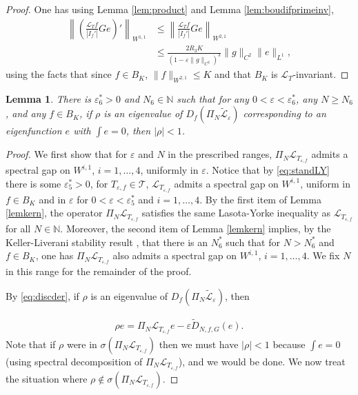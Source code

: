 \documentclass[12pt]{article}
\def\L{\mathcal{L}}
\newcommand{\eps}{\varepsilon}
\theoremstyle{plain}
\newtheorem{lemma}[theorem]{Lemma}
\begin{document}
{\begin{proof}
One has using Lemma \ref{lem:product} and Lemma \ref{lem:boudifprimeinv},
\begin{align}\label{eq:boundnumif}
\left\|\left(\frac{\L_Tf}{|I_{f}'|}  G e\right)'\right\|_{W^{1,1}}&\leq \left\|\frac{\L_Tf}{|I_{f}'|} G e\right\|_{W^{2,1}}\nonumber\\
&\leq \frac{2R_3K}{(1-\eps\|g\|_{C^2})^3} \|g\|_{C^2}\|e\|_{L^1},
\end{align}
using the facts that since $f\in B_K$, $\|f\|_{W^{2,1}}\leq K$ and that $B_K$ is $\L_T$-invariant.
\end{proof}




\begin{lemma}
\label{lem:3.3}
There is $\eps^*_6>0$ and $N_6\in \mathbb N$ such that for any  $0<\eps<\eps^*_6$, any  $N\ge N_6$, and any $f\in B_K$,
if $\rho$ is an 
eigenvalue of $D_f(\Pi_N\tilde{\mathcal L}_\eps)$ 
corresponding to an eigenfunction $e$ with $\int e=0$, then $|\rho|< 1$.
\end{lemma}
\begin{proof}
We first show that for $\eps$ and $N$ in the prescribed ranges,
$\Pi_N\L_{T_{\eps,f}}$ admits a spectral gap on $W^{i,1}$, $i=1,\dots,4$, uniformly in $\eps$.
Notice that by \eqref{eq:standLY} there is some $\eps_5^*>0$, for $T_{\eps,f}\in\mathcal T$, $\L_{T_{\eps,f}}$ admits a spectral gap on $W^{i,1}$, uniform in $f\in B_K$ and in $\eps$ for $0<\eps<\eps^*_5$ and $i=1,\dots,4.$
By the first item of Lemma \ref{lemkern}, the operator $\Pi_N\L_{T_{\eps,f}}$ satisfies the same Lasota-Yorke inequality as $\L_{T_{\eps,f}}$ for all $N\in\mathbb{N}$. Moreover, the second item of Lemma \ref{lemkern} implies, by the Keller-Liverani stability result \cite{KL99}, that there is an $N_6^*$  such that for $N>N_6^*$ and $f\in B_K$, one has $\Pi_N\L_{T_{\eps,f}}$ also admits a spectral gap on $W^{i,1}$, $i=1,\dots,4.$ 
We fix $N$ in this range for the remainder of the proof.

By \eqref{eq:discder}, if $\rho$ is an eigenvalue of $D_f(\Pi_N\tilde{\mathcal L}_\eps)$, then

\begin{align}\label{eq:eig}
    \rho e=\Pi_N\L_{T_{\eps, f}}e -\eps\tilde D_{N,f,G}(e).
\end{align}
Note that if $\rho$ were in $\sigma(\Pi_N\L_{T_{\eps, f}})$ then we must have $|\rho|<1$ because $\int e=0$ (using spectral decomposition of $\Pi_N\L_{T_{\eps, f}}$), and we would be done.
We now treat the situation where $\rho\notin\sigma(\Pi_N\L_{T_{\eps, f}})$. 


\end{proof}}
\end{document}
